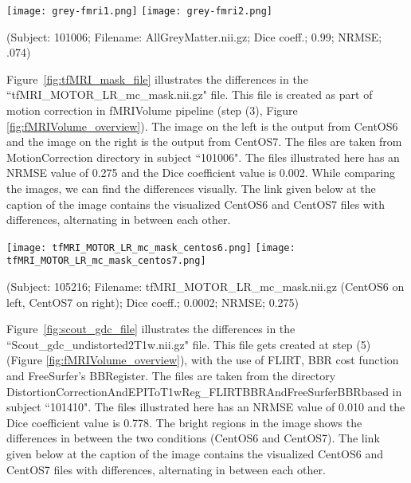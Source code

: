 \begin{center}
\texttt{[image: grey-fmri1.png]}%
\texttt{[image: grey-fmri2.png]}%
\caption*{(Subject: 101006; Filename: AllGreyMatter.nii.gz; Dice coeff.; 0.99; NRMSE; .074)}
\label{fig:allgrey_matter}
\end{center}

Figure~\ref{fig:tfMRI_mask_file} illustrates the differences in the ``tfMRI\_MOTOR\_LR\_mc\_mask.nii.gz" file. This file is created as part of motion correction in fMRIVolume pipeline (step (3), Figure \ref{fig:fMRIVolume_overview}). The image on the left is the output from CentOS6 and the image on the right is the output from CentOS7. The files are taken from MotionCorrection directory in subject ``101006". The files illustrated here has an NRMSE value of 0.275 and the Dice coefficient value is 0.002. While comparing the images, we can find the differences visually.
The link given below at the caption of the image contains the visualized CentOS6 and CentOS7 files with differences, alternating in between each other.

\begin{center}
\texttt{[image: tfMRI\_MOTOR\_LR\_mc\_mask\_centos6.png]}%
\texttt{[image: tfMRI\_MOTOR\_LR\_mc\_mask\_centos7.png]}
\caption*{(Subject: 105216; Filename: tfMRI\_MOTOR\_LR\_mc\_mask.nii.gz (CentOS6 on left, CentOS7 on right); Dice coeff.; 0.0002; NRMSE; 0.275)}
\label{fig:tfMRI_mask_file}
\end{center}

Figure~\ref{fig:scout_gdc_file} illustrates the differences in the ``Scout\_gdc\_undistorted2T1w.nii.gz" file. This file gets created at step (5) (Figure \ref{fig:fMRIVolume_overview}), with the use of FLIRT, BBR cost function and FreeSurfer's BBRegister. The files are taken from the directory DistortionCorrectionAndEPIToT1wReg\_FLIRTBBRAndFreeSurferBBRbased in subject ``101410". The files illustrated here has an NRMSE value of 0.010 and the Dice coefficient value is 0.778. The bright regions in the image shows the differences in between the two conditions (CentOS6 and CentOS7). The link given below at the caption of the image contains the visualized CentOS6 and CentOS7 files with differences, alternating in between each other.

